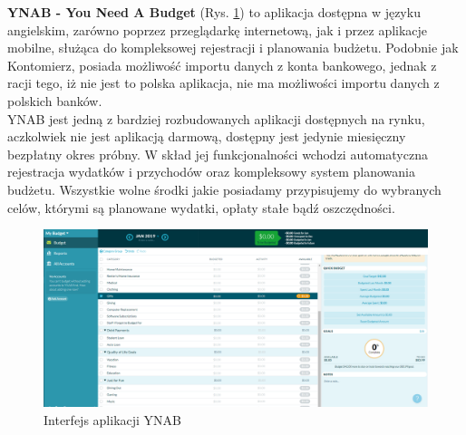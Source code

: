 \textbf{YNAB - You Need A Budget} (Rys. \ref{ynab_interfejs}) to aplikacja dostępna w języku angielskim, zarówno poprzez przeglądarkę internetową, jak i przez aplikacje mobilne, służąca do kompleksowej rejestracji i planowania budżetu. Podobnie jak Kontomierz, posiada możliwość importu danych z konta bankowego, jednak z racji tego, iż nie jest to polska aplikacja, nie ma możliwości importu danych z polskich banków.\\
YNAB jest jedną z bardziej rozbudowanych aplikacji dostępnych na rynku, aczkolwiek nie jest aplikacją darmową,  dostępny jest jedynie miesięczny bezpłatny okres próbny. W skład jej funkcjonalności wchodzi automatyczna rejestracja wydatków i przychodów oraz kompleksowy system planowania budżetu. Wszystkie wolne środki jakie posiadamy przypisujemy do wybranych celów, którymi są planowane wydatki, opłaty stałe bądź oszczędności.
\begin{figure}[!ht]
	\begin{center}
		\includegraphics[width=6in]{img/aplikacje/ynab_interfejs.png}
		\caption{Interfejs aplikacji YNAB}
		\label{ynab_interfejs}
	\end{center}
\end{figure}

